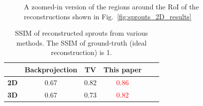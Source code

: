 \documentclass[journal]{IEEEtran}
\begin{document}
\begin{figure}[!h]
\centering
{}
{}
\caption{A zoomed-in version of the regions around the RoI of the reconstructions shown in Fig.~\ref{fig:sprouts_2D_results}}
\label{fig:sprouts_zoomed_2D_results}
\end{figure}
\begin{table}[!h]
  \centering
  \caption{SSIM of reconstructed sprouts from various
    methods. The SSIM of ground-truth (ideal reconstruction) is 1.}
\begin{tabular}{|l|c|c|c|c|c|}
\hline &
\textbf{Backprojection} & \textbf{TV} & \textbf{This paper}
 \\ \hline \textbf{2D} & 0.67
& 0.82 & \textcolor{red}{0.86} \\ \hline \textbf{3D} & 0.67 & 0.73 & \textcolor{red}{0.82}
\\ \hline
\end{tabular}
\label{table:sprouts_ssim}
\end{table}
\end{document}
